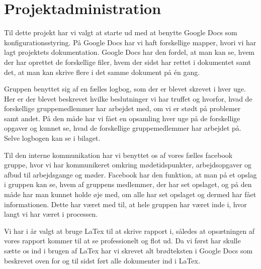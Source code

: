\section{Projektadministration}
Til dette projekt har vi valgt at starte ud med at benytte Google Docs som konfigurationsstyring. På Google Docs har vi haft forskellige mapper, hvori vi har lagt projektets dokumentation. Google Docs har den fordel, at man kan se, hvem der har oprettet de forskellige filer, hvem der sidst har rettet i dokumentet samt det, at man kan skrive flere i det samme dokument på én gang.

Gruppen benyttet sig af en fælles logbog, som der er blevet skrevet i hver uge. Her er der blevet beskrevet hvilke beslutninger vi har truffet og hvorfor, hvad de forskellige gruppemedlemmer har arbejdet med, om vi er stødt på problemer samt andet. På den måde har vi fået en opsamling hver uge på de forskellige opgaver og kunnet se, hvad de forskellige gruppemedlemmer har arbejdet på. Selve logbogen kan se i bilaget.

Til den interne kommunikation har vi benyttet os af vores fælles facebook gruppe, hvor vi har kommunikeret omkring mødetidspunkter, arbejdsopgaver og afbud til arbejdsgange og møder. Facebook har den funktion, at man på et opslag i gruppen kan se, hvem af gruppens medlemmer, der har set opslaget, og på den måde har man kunnet holde øje med, om alle har set opslaget og dermed har fået informationen. Dette har været med til, at hele gruppen har været inde i, hvor langt vi har været i processen.

Vi har i år valgt at bruge LaTex til at skrive rapport i, således at  opsætningen af vores rapport kommer til at se professionelt og flot ud. Da vi først har skulle sætte os ind i brugen af LaTex har vi skrevet alt brødteksten i Google Docs som beskrevet oven for og til sidst ført alle dokumenter ind i LaTex.

\vspace{0.3 cm}

